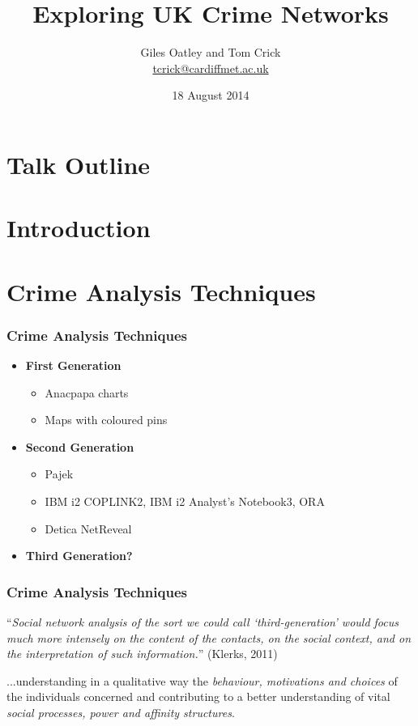 \documentclass[pdftex]{beamer}
\title[FOSINT-SI 2014]{Exploring UK Crime Networks}
\author[\#fosintsi14]{Giles Oatley and Tom Crick\\\url{tcrick@cardiffmet.ac.uk}}
\institute[@DrTomCrick]{Department of Computing \& Information
  Systems\\Cardiff Metropolitan University, UK\\\url{http://drtomcrick.com}}
\date{18 August 2014}
\begin{document}
\begin{frame}
\titlepage
\end{frame}

\section*{Talk Outline} 
\begin{frame} 
\tableofcontents 
\end{frame} 

\section{Introduction}

\section{Crime Analysis Techniques}

\begin{frame}
\frametitle{Crime Analysis Techniques}
\begin{itemize}
\item {\textbf{First Generation}}
\begin{itemize}
\item Anacpapa charts
\item Maps with coloured pins\newline
\end{itemize}
\pause
\item {\textbf{Second Generation}}
\begin{itemize}
\item Pajek
\item IBM i2 COPLINK2, IBM i2 Analyst’s Notebook3, ORA
\item Detica NetReveal\newline
\end{itemize}
\pause
\item {\textbf{Third Generation?}}
\end{itemize}
\end{frame}

\begin{frame}
\frametitle{Crime Analysis Techniques}
``{\emph{Social network analysis of the sort we could call ‘third-generation’
would focus much more intensely on the content of the contacts, on the
social context, and on the interpretation of such information.}}''
(Klerks, 2011)\newline\newline

...understanding in a qualitative way the {\emph{behaviour, motivations and
choices}} of the individuals concerned and contributing to a better
understanding of vital {\emph{social processes, power and affinity structures}}.



\end{frame}
\end{document}
